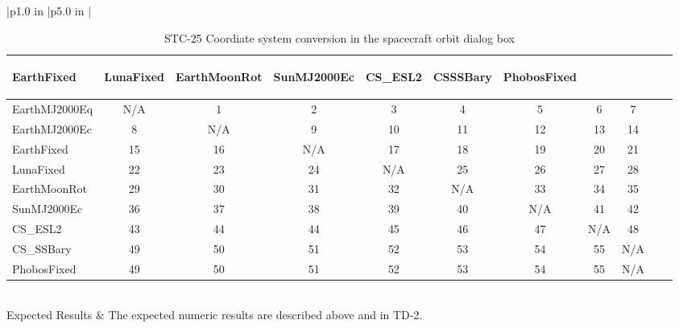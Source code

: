 \begin{table}[htbp!]
\begin{tabular}{|p{1.0 in} |p{5.0 in} |}
\begin{centering}
\begin{tabular}{|l|c|c|c|c|c|c|c|c|c|c|}
             {\begin{sideways}\parbox{2.9cm}{EarthFixed}\end{sideways}} &
             {\begin{sideways}\parbox{2.9cm}{LunaFixed}\end{sideways}} &
             {\begin{sideways}\parbox{2.9cm}{EarthMoonRot}\end{sideways}}  &
             {\begin{sideways}\parbox{2.9cm}{SunMJ2000Ec}\end{sideways}}  &
             {\begin{sideways}\parbox{2.9cm}{CS\_ESL2}\end{sideways}}  &
             {\begin{sideways}\parbox{2.9cm}{CSSSBary}\end{sideways}} &
             {\begin{sideways}\parbox{2.9cm}{PhobosFixed}\end{sideways}}   \\ \hline
             EarthMJ2000Eq& N/A & 1 & 2 & 3 & 4 & 5 & 6 & 7 \\ \hline
             EarthMJ2000Ec & 8 & N/A & 9 & 10 & 11 & 12 & 13 & 14\\ \hline
             EarthFixed & 15 & 16 & N/A & 17 & 18 & 19 & 20 & 21\\ \hline
             LunaFixed & 22 & 23 & 24 & N/A & 25 & 26 & 27 & 28\\ \hline
             EarthMoonRot & 29 & 30 & 31 & 32 & N/A & 33 & 34 & 35\\ \hline
             SunMJ2000Ec & 36 & 37 & 38 & 39 & 40 &  N/A & 41 & 42\\ \hline
             CS\_ESL2 & 43 & 44 & 44 & 45 & 46 & 47 & N/A & 48\\ \hline
             CS\_SSBary & 49 & 50 & 51 & 52 & 53 & 54 & 55 & N/A\\ \hline
             PhobosFixed & 49 & 50 & 51 & 52 & 53 & 54 & 55 & N/A\\ \hline
          \end{tabular}
          \end{centering} \vspace{0.1 in}\\
         \hline
         Expected Results & The expected numeric results are described above and in TD-2.\\
      \hline
\end{tabular}
   \label{Table:STC-25}
   \caption{STC-25 Coordiate system conversion in the spacecraft orbit dialog box}
\end{table} 
